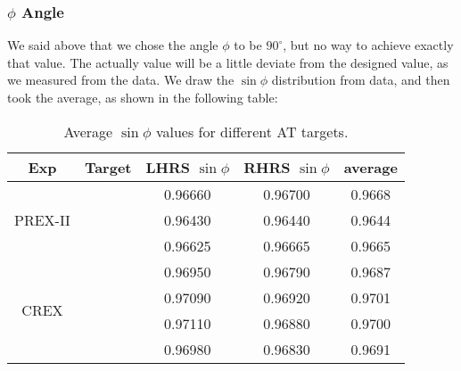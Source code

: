 \subsubsection{$\phi$ Angle}
We said above that we chose the angle $\phi$ to be $90^\circ$, but no way to 
achieve exactly that value. The actually value will be a little deviate from
the designed value, as we measured from the data. We draw the $\sin\phi$ distribution
from data, and then took the average, as shown in the following table:
\begin{table}[!htbp]
    \centering
    \begin{tabular}{c c | c c c}
	\hline
	Exp & Target	& LHRS $\sin\phi$   & RHRS $\sin\phi$	& average   \\
	\hline
	\multirow{3}{*}{PREX-II}
	    & \C    & 0.96660   & 0.96700	& 0.9668    \\ 
	    & \ca   & 0.96430   & 0.96440	& 0.9644    \\ 
	    & \Pb   & 0.96625   & 0.96665	& 0.9665    \\ 
	\hline
	\multirow{4}{*}{CREX}
	    & \C    & 0.96950   & 0.96790	& 0.9687    \\ 
	    & \ca   & 0.97090   & 0.96920	& 0.9701    \\ 
	    & \Ca   & 0.97110   & 0.96880	& 0.9700    \\ 
	    & \Pb   & 0.96980   & 0.96830	& 0.9691    \\ 
	\hline
    \end{tabular}
    \caption{Average $\sin\phi$ values for different AT targets.}
\end{table}

